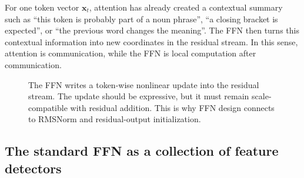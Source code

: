 \documentclass[11pt,a4paper]{article}
\theoremstyle{definition}
\theoremstyle{plain}
\newcommand{\vx}{\bm{x}}
\newcommand{\dmodel}{d_{\mathrm{model}}}
\newcommand{\dff}{d_{\mathrm{ff}}}
\begin{document}
\begin{intuitionbox}
For one token vector $\vx_t$, attention has already created a contextual summary such as ``this token is probably part of a noun phrase'', ``a closing bracket is expected'', or ``the previous word changes the meaning''. The FFN then turns this contextual information into new coordinates in the residual stream. In this sense, attention is communication, while the FFN is local computation after communication.
\end{intuitionbox}

\begin{figure}[H]
\centering
{}
\caption{The FFN writes a token-wise nonlinear update into the residual stream. The update should be expressive, but it must remain scale-compatible with residual addition. This is why FFN design connects to RMSNorm and residual-output initialization.}
\label{fig:ffn-residual-role}
\end{figure}

\subsection{The standard FFN as a collection of feature detectors}
\end{document}
